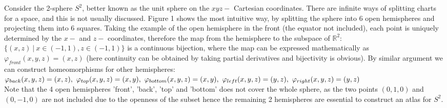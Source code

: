 \documentclass[12pt,twoside]{article}
\begin{document}
\begin{example}{}
\label{2sphere}
Consider the 2-sphere $S^2$, better known as the unit sphere on the $xyz-$ Cartesian coordinates. There are infinite ways of splitting charts for a space, and this is not usually discussed. Figure 1 shows the most intuitive  way, by
 splitting the sphere into 6 open hemispheres and projecting them into 6 squares. Taking the example of the open hemisphere in the front (the equator not included), each point is uniquely determined by the $x-$ and $z-$ coordinates, therefore the map from the hemisphere to the subspace of $\mathbb{R}^2$: $\{(x,z)\ |\ x \in (-1,1), z \in (-1,1)\}$ is a continuous bijection, where the map can be expressed mathematically as $\varphi_{front}(x,y,z) = (x,z)$ (here continuity can be obtained by taking partial derivatives and bijectivity is obvious). By similar argument we can construct homeomorphisms for other hemispheres:
\\
$\varphi_{back}(x,y,z) = (x,z), \ \varphi_{top}(x,y,z) = (x,y), \ \varphi_{bottom}(x,y,z) = (x,y), \ \varphi_{left}(x,y,z) = (y,z),\\
\ \varphi_{right}(x,y,z) = (y,z)$
\\
Note that the 4 open hemispheres 'front', 'back', 'top' and 'bottom' does not cover the whole sphere, as the two points $(0,1,0)$ and $(0,-1,0)$ are not included due to the openness of the subset hence the remaining 2 hemispheres are essential to construct an atlas for $S^2$.\\
\end{example}
\end{document}
